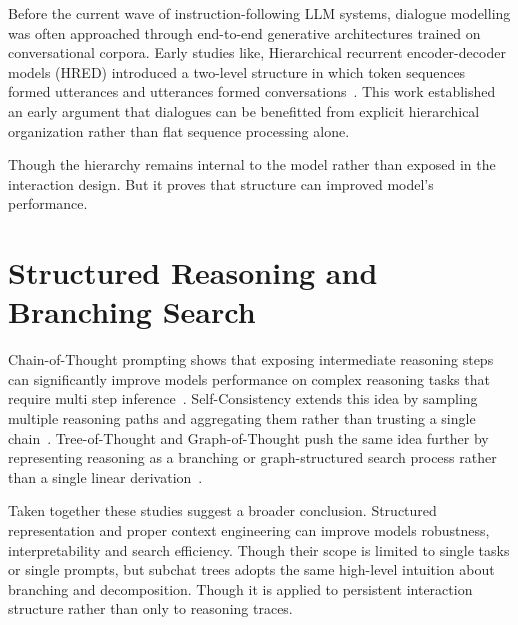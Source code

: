 Before the current wave of instruction-following LLM systems, dialogue modelling was often approached through end-to-end generative architectures trained on conversational corpora. Early studies like, Hierarchical recurrent encoder-decoder models (HRED) introduced a two-level structure in which token sequences formed utterances and utterances formed conversations~\cite{serban2016hred}. This work  established an early argument that dialogues can be benefitted from explicit hierarchical organization rather than flat sequence processing alone.

Though the hierarchy remains internal to the model rather than exposed in the interaction design. But it proves that structure can improved model's performance.

\section{Structured Reasoning and Branching Search}\label{subsec:reasoning}

Chain-of-Thought prompting shows that exposing intermediate reasoning steps can significantly improve models performance on complex reasoning tasks that require multi step inference~\cite{wei2022cot}. Self-Consistency extends this idea by sampling multiple reasoning paths and aggregating them rather than trusting a single chain~\cite{wang2023selfconsistency}. Tree-of-Thought and Graph-of-Thought push the same idea further by representing reasoning as a branching or graph-structured search process rather than a single linear derivation~\cite{yao2023tot,besta2023got}.









Taken together these studies suggest a broader conclusion. Structured representation and proper context engineering can improve models robustness, interpretability and search efficiency. Though their scope is limited to single tasks or single prompts, but subchat trees adopts the same high-level intuition about branching and decomposition. Though it is  applied to persistent interaction structure rather than only to reasoning traces.









